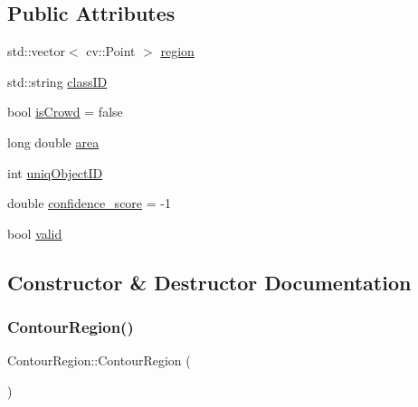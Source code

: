 \subsection*{Public Attributes}
\begin{DoxyCompactItemize}
\item 
std\+::vector$<$ cv\+::\+Point $>$ \hyperlink{struct_contour_region_a638a84fef2113ccf2016f29273f6992d}{region}
\item 
std\+::string \hyperlink{struct_contour_region_ada861b3bc539bf62d0344a5a2b1b06da}{class\+ID}
\item 
bool \hyperlink{struct_contour_region_a6bdf33777074f8498b55e3c89817906d}{is\+Crowd} = false
\item 
long double \hyperlink{struct_contour_region_a332a68b8c9b5fee572ee832f1b455e28}{area}
\item 
int \hyperlink{struct_contour_region_a6b3027e2fcb6f62ec59d57073aac29ea}{uniq\+Object\+ID}
\item 
double \hyperlink{struct_contour_region_a784f18630b662f78d2cb72ce44e2e763}{confidence\+\_\+score} = -\/1
\item 
bool \hyperlink{struct_contour_region_a3b8236711736047f72242b486ca288da}{valid}
\end{DoxyCompactItemize}


\subsection{Constructor \& Destructor Documentation}
\mbox{\label{struct_contour_region_a24b9b3e8e9eaf336089c0ba91b0579ca}} 
\subsubsection{\texorpdfstring{Contour\+Region()}{ContourRegion()}\hspace{0.1cm}{\footnotesize\ttfamily [1/4]}}
{\footnotesize\ttfamily Contour\+Region\+::\+Contour\+Region (\begin{DoxyParamCaption}{ }\end{DoxyParamCaption})\hspace{0.3cm}{\ttfamily [inline]}}

\mbox{\label{struct_contour_region_a8c5b1aa1ee317050828ebd5f53739285}} 

